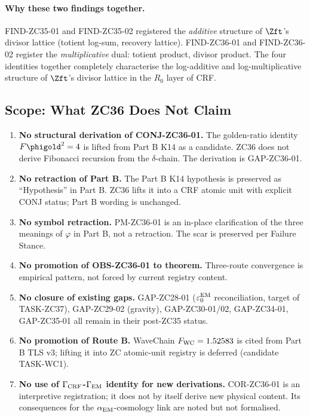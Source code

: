 \documentclass[12pt, a4paper]{article}
\begin{document}
\paragraph{Why these two findings together.}
FIND-ZC35-01 and FIND-ZC35-02 registered the \emph{additive}
structure of $\Zft$'s divisor lattice (totient log-sum,
recovery lattice). FIND-ZC36-01 and FIND-ZC36-02 register the
\emph{multiplicative} dual: totient product, divisor product.
The four identities together completely characterise the
log-additive and log-multiplicative structure of $\Zft$'s
divisor lattice in the $R_0$ layer of CRF.

\subsection{Scope: What ZC36 Does Not Claim}
\label{sec:scope}

\begin{enumerate}[leftmargin=*, noitemsep]
  \item \textbf{No structural derivation of CONJ-ZC36-01.}
        The golden-ratio identity $F\phigold^2 = 4$ is lifted
        from Part B K14 as a candidate. ZC36 does not derive
        Fibonacci recursion from the $\delta$-chain. The
        derivation is GAP-ZC36-01.

  \item \textbf{No retraction of Part B.}
        The Part B K14 hypothesis is preserved as ``Hypothesis''
        in Part B. ZC36 lifts it into a CRF atomic unit with
        explicit CONJ status; Part B wording is unchanged.

  \item \textbf{No symbol retraction.}
        PM-ZC36-01 is an in-place clarification of the three
        meanings of $\varphi$ in Part B, not a retraction. The
        scar is preserved per Failure Stance.

  \item \textbf{No promotion of OBS-ZC36-01 to theorem.}
        Three-route convergence is empirical pattern, not
        forced by current registry content.

  \item \textbf{No closure of existing gaps.}
        GAP-ZC28-01 ($\varepsilon_0^{\rm EM}$ reconciliation,
        target of TASK-ZC37), GAP-ZC29-02 (gravity),
        GAP-ZC30-01/02, GAP-ZC34-01, GAP-ZC35-01 all remain
        in their post-ZC35 status.

  \item \textbf{No promotion of Route B.}
        WaveChain $F_{\rm WC} = 1.52583$ is cited from
        Part B TLS v3; lifting it into ZC atomic-unit registry
        is deferred (candidate TASK-WC1).

  \item \textbf{No use of $\Gamma_{\rm CRF}$-$\Gamma_{\rm EM}$
        identity for new derivations.}
        COR-ZC36-01 is an interpretive registration; it does
        not by itself derive new physical content. Its
        consequences for the $\alpha_{\rm EM}$-cosmology link
        are noted but not formalised.
\end{enumerate}
\end{document}
